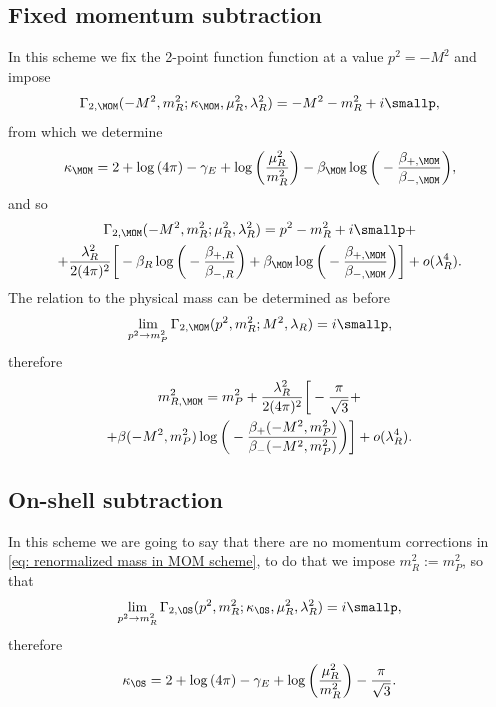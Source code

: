 \subsection{Fixed momentum subtraction}
In this scheme we fix the 2-point function function at a value $p^2 = -M^2$ and impose
\begin{equation}
    \Gamma_{2,\MOM}(-M^2,m_R^2;\kappa_\MOM,\mu_R^2,\lambda_R^2) = -M^2 - m_R^2 + i\smallp,
\end{equation}
from which we determine 
\begin{equation}
    \kappa_\MOM = 2 + \log{(4\pi)} - \gamma_E + \log{\bigg(\frac{\mu_R^2}{m_R^2}\bigg)} - \beta_\MOM\log{\bigg(-\frac{\beta_{+,\MOM}}{\beta_{-,\MOM}}\bigg)},
\end{equation}
and so
\begin{multline}
    \Gamma_{2,\MOM}(-M^2,m_R^2;\mu_R^2,\lambda_R^2) = p^2 -m_R^2 + i\smallp + \\
    +\frac{\lambda_R^2}{2(4\pi)^2}\bigg[-\beta_R\log{\bigg(-\frac{\beta_{+,R}}{\beta_{-,R}}\bigg)} + \beta_\MOM\log{\bigg(-\frac{\beta_{+,\MOM}}{\beta_{-,\MOM}}\bigg)}\bigg] + o(\lambda^4_R).
\end{multline}
The relation to the physical mass can be determined as before
\begin{equation}
    \lim_{p^2 \to m_P^2}\Gamma_{2,\MOM}(p^2,m_R^2;M^2,\lambda_R) = i\smallp,
\end{equation}
therefore
\begin{multline}
\label{eq: renormalized mass in MOM scheme}
    m_{R,\MOM}^2 = m_P^2 + \frac{\lambda_R^2}{2(4\pi)^2}\bigg[-\frac{\pi}{\sqrt{3}} + \\ + \beta(-M^2,m_P^2)\log{\bigg(-\frac{\beta_+(-M^2,m_P^2)}{\beta_-(-M^2,m_P^2)}\bigg)}\bigg] + o(\lambda^4_R).
\end{multline}

\subsection{On-shell subtraction}
In this scheme we are going to say that there are no momentum corrections in \eqref{eq: renormalized mass in MOM scheme}, to do that we impose $m_R^2 := m_P^2$, so that
\begin{equation}
    \lim_{p^2 \to m_R^2}\Gamma_{2,\OS}(p^2,m_R^2;\kappa_\OS,\mu_R^2,\lambda_R^2) = i\smallp,
\end{equation}
therefore
\begin{equation}
    \kappa_\OS = 2 + \log{(4\pi)} - \gamma_E + \log{\bigg(\frac{\mu_R^2}{m_R^2}\bigg)} - \frac{\pi}{\sqrt{3}}.
\end{equation}

